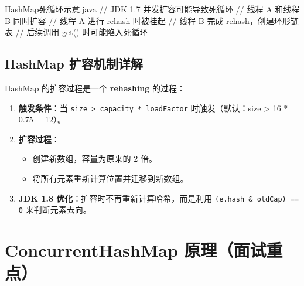 \begin{codeblock}[Java]{HashMap死循环示意.java}
// JDK 1.7 并发扩容可能导致死循环
// 线程 A 和线程 B 同时扩容
// 线程 A 进行 rehash 时被挂起
// 线程 B 完成 rehash，创建环形链表
// 后续调用 get() 时可能陷入死循环
\end{codeblock}


\subsection{HashMap 扩容机制详解}

HashMap 的扩容过程是一个\textbf{ rehashing }的过程：

\begin{enumerate}
    \item \textbf{触发条件}：当 \texttt{size > capacity * loadFactor} 时触发（默认：size > 16 * 0.75 = 12）。
    \item \textbf{扩容过程}：
    \begin{itemize}
        \item 创建新数组，容量为原来的 2 倍。
        \item 将所有元素重新计算位置并迁移到新数组。
    \end{itemize}
    \item \textbf{JDK 1.8 优化}：扩容时不再重新计算哈希，而是利用 \texttt{(e.hash \& oldCap) == 0} 来判断元素去向。
\end{enumerate}


\section{ConcurrentHashMap 原理（面试重点）}

